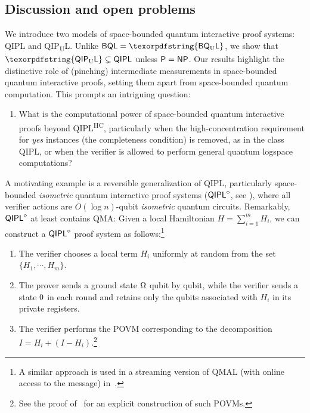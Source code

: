\documentclass[11pt, a4paper]{article}
\numberwithin{equation}{section}
\numberwithin{figure}{section}
\newcommand{\Ptime}{\textnormal{\textsf{P}}\xspace}
\newcommand{\NP}{\textnormal{\textsf{NP}}\xspace}
\newcommand{\QMA}{\textnormal{\textsf{QMA}}\xspace}
\newcommand{\QIPL}{\textnormal{\textsf{QIPL}}\xspace}
\newcommand{\QMAL}{\textnormal{\textsf{QMAL}}\xspace}
\newcommand{\QIPUL}{\texorpdfstring{\textnormal{\textsf{QIP}\textsubscript{\textnormal{U}}\textsf{L}}}\xspace}
\newcommand{\QIPLHC}{\texorpdfstring{\textnormal{\textsf{QIPL}\textsuperscript{\textnormal{HC}}}}\xspace}
\newcommand{\BQL}{\textnormal{\textsf{BQL}}\xspace}
\newcommand{\BQUL}{\texorpdfstring{\textnormal{\textsf{BQ}\textsubscript{U}\textsf{L}}}\xspace}
\let\ket\relax\DeclarePairedDelimiter\ket{\lvert}{\rangle}
\begin{document}
\subsection{Discussion and open problems}

We introduce two models of space-bounded quantum interactive proof systems: \QIPL{} and \QIPUL{}. Unlike $\BQL = \BQUL$, we show that $\QIPUL \subsetneq \QIPL$ unless $\Ptime = \NP$. Our results highlight the distinctive role of (pinching) intermediate measurements in space-bounded quantum interactive proofs, setting them apart from space-bounded quantum computation. This prompts an intriguing question: 

\begin{enumerate}[label={\upshape(\alph*)},itemsep=0.3em,topsep=0.3em,parsep=0.3em]
    \item What is the computational power of space-bounded quantum interactive proofs beyond \QIPLHC{}, particularly when the high-concentration requirement for \textit{yes} instances (the completeness condition) is removed, as in the class \QIPL{}, or when the verifier is allowed to perform general quantum logspace computations?  \label{probitem:generalQIPL}
\end{enumerate}

A motivating example is a reversible generalization of \QIPL{}, particularly space-bounded \textit{isometric} quantum interactive proof systems ($\QIPL^{\diamond}$, see ), where all verifier actions are $O(\log{n})$-qubit \textit{isometric} quantum circuits. Remarkably, $\QIPL^{\diamond}$ at least contains \QMA{}:
Given a local Hamiltonian $H = \sum_{i=1}^m H_i$, we can construct a $\QIPL^{\diamond}$ proof system as follows:\footnote{A similar approach is used in a streaming version of \QMAL{} (with online access to the message) in~\cite{GR23online}.} 
\begin{enumerate}[label={\upshape(\roman*)},itemsep=0.3em,topsep=0.3em,parsep=0.3em]
    \item The verifier chooses a local term $H_i$ uniformly at random from the set $\{H_1,\cdots,H_m\}$. 
    \item The prover sends a ground state $\ket{\Omega}$ qubit by qubit, while the verifier sends a state $\ket{0}$ in each round and retains only the qubits associated with $H_i$ in its private registers. 
    \item The verifier performs the POVM corresponding to the decomposition $I = H_i + (I - H_i)$.\footnote{See the proof of~\cite[Proposition 14.2]{KSV02} for an explicit construction of such POVMs.} 
\end{enumerate}
\end{document}
